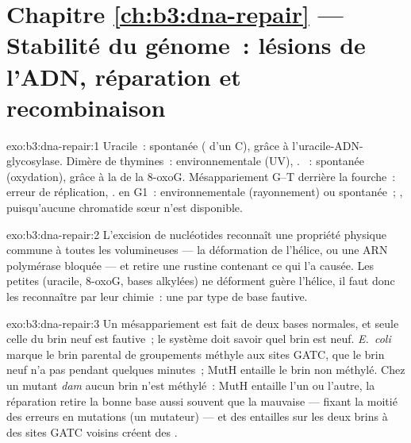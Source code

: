 \section*{Chapitre \ref{ch:b3:dna-repair} --- Stabilité du génome~: lésions de l'ADN, réparation et recombinaison}

\begin{solution}{exo:b3:dna-repair:1}
Uracile~: spontanée ( d'un C),  grâce à l'uracile-ADN-glycosylase. Dimère de thymines~:
environnementale (UV), .
~: spontanée (oxydation), 
grâce à la  de la 8-oxoG. Mésappariement G--T derrière la
fourche~: erreur de réplication, .
 en G1~: environnementale (rayonnement) ou
spontanée~; , puisqu'aucune
chromatide sœur n'est disponible.
\end{solution}

\begin{solution}{exo:b3:dna-repair:2}
L'excision de nucléotides reconnaît une propriété physique commune à
toutes les  volumineuses --- la déformation de l'hélice, ou une
ARN polymérase bloquée --- et retire une rustine contenant ce qui l'a
causée. Les petites  (uracile, 8-oxoG, bases alkylées) ne
déforment guère l'hélice, il faut donc les reconnaître par leur
chimie~: une  par type de base fautive.
\end{solution}

\begin{solution}{exo:b3:dna-repair:3}
Un mésappariement est fait de deux bases normales, et seule celle du
brin neuf est fautive~; le système doit savoir quel brin est neuf.
\emph{E.~coli} marque le brin parental de groupements méthyle aux
sites GATC, que le brin neuf n'a pas pendant quelques minutes~; MutH
entaille le brin non méthylé. Chez un mutant \emph{dam} aucun brin
n'est méthylé~: MutH entaille l'un ou l'autre, la réparation retire la
bonne base aussi souvent que la mauvaise --- fixant la moitié des
erreurs en mutations (un mutateur) --- et des entailles sur les deux
brins à des sites GATC voisins créent des .
\end{solution}

